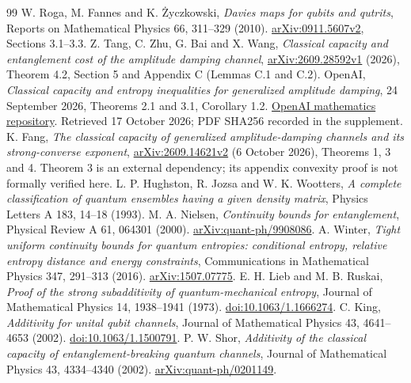 \documentclass[11pt]{article}
\begin{document}
\begin{thebibliography}{99}
\small\setlength{\itemsep}{3pt}
 W. Roga, M. Fannes and K. \.{Z}yczkowski, \emph{Davies maps for qubits and qutrits}, Reports on Mathematical Physics 66, 311--329 (2010). \href{https://arxiv.org/abs/0911.5607}{arXiv:0911.5607v2}, Sections 3.1--3.3.
 Z. Tang, C. Zhu, G. Bai and X. Wang, \emph{Classical capacity and entanglement cost of the amplitude damping channel}, \href{https://arxiv.org/abs/2609.28592}{arXiv:2609.28592v1} (2026), Theorem 4.2, Section 5 and Appendix C (Lemmas C.1 and C.2).
 OpenAI, \emph{Classical capacity and entropy inequalities for generalized amplitude damping}, 24 September 2026, Theorems 2.1 and 3.1, Corollary 1.2. \href{https://github.com/openai/math/tree/main/preprints/Classical-capacity-and-entropy-inequalities-for-generalized-amplitude-damping-September-24-2026}{OpenAI mathematics repository}. Retrieved 17 October 2026; PDF SHA256 recorded in the supplement.
 K. Fang, \emph{The classical capacity of generalized amplitude-damping channels and its strong-converse exponent}, \href{https://arxiv.org/abs/2609.14621v2}{arXiv:2609.14621v2} (6 October 2026), Theorems 1, 3 and 4. Theorem 3 is an external dependency; its appendix convexity proof is not formally verified here.
 L. P. Hughston, R. Jozsa and W. K. Wootters, \emph{A complete classification of quantum ensembles having a given density matrix}, Physics Letters A 183, 14--18 (1993).
 M. A. Nielsen, \emph{Continuity bounds for entanglement}, Physical Review A 61, 064301 (2000). \href{https://arxiv.org/abs/quant-ph/9908086}{arXiv:quant-ph/9908086}.
 A. Winter, \emph{Tight uniform continuity bounds for quantum entropies: conditional entropy, relative entropy distance and energy constraints}, Communications in Mathematical Physics 347, 291--313 (2016). \href{https://arxiv.org/abs/1507.07775}{arXiv:1507.07775}.
 E. H. Lieb and M. B. Ruskai, \emph{Proof of the strong subadditivity of quantum-mechanical entropy}, Journal of Mathematical Physics 14, 1938--1941 (1973). \href{https://doi.org/10.1063/1.1666274}{doi:10.1063/1.1666274}.
 C. King, \emph{Additivity for unital qubit channels}, Journal of Mathematical Physics 43, 4641--4653 (2002). \href{https://doi.org/10.1063/1.1500791}{doi:10.1063/1.1500791}.
 P. W. Shor, \emph{Additivity of the classical capacity of entanglement-breaking quantum channels}, Journal of Mathematical Physics 43, 4334--4340 (2002). \href{https://arxiv.org/abs/quant-ph/0201149}{arXiv:quant-ph/0201149}.

\end{thebibliography}
\end{document}
